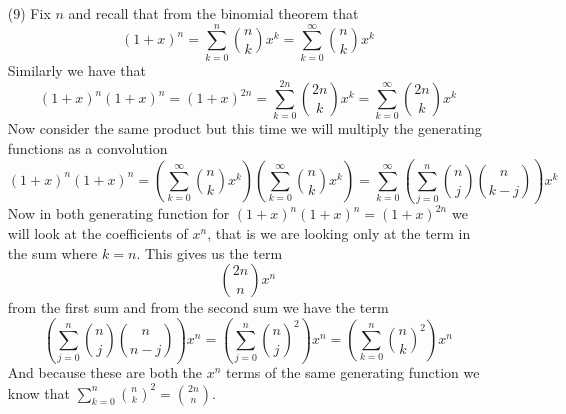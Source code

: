 \documentclass[12pt]{amsart}
\theoremstyle{definition}
\begin{document}
\begin{itemize}
\item[(9)] %
Fix $n$ and recall that from the binomial theorem that
$$(1+x)^n={\sum_{k=0}^n{n\choose k}x^k}={\sum_{k=0}^\infty{n\choose k}x^k}$$
Similarly we have that $$(1+x)^n(1+x)^n={(1+x)^{2n}}={\sum_{k=0}^{2n}{2n\choose k}x^k}={\sum_{k=0}^\infty{2n\choose k}x^k}$$
Now consider the same product but this time we will multiply the generating functions as a convolution
$$(1+x)^n(1+x)^n={\left(\sum_{k=0}^\infty{n\choose k}x^k\right)\left(\sum_{k=0}^\infty{n\choose k}x^k\right)}={\sum_{k=0}^\infty\left(\sum_{j=0}^n{n\choose j}{n\choose k-j}\right)x^k}$$
Now in both generating function for $(1+x)^n(1+x)^n=(1+x)^{2n}$ we will look at the coefficients of $x^n$, that is we are looking only at the term in the sum where $k=n$. This gives us the term 
$${{2n\choose n}x^n}$$
from the first sum and from the second sum we have the term $${\left(\sum_{j=0}^n{n\choose j}{n\choose n-j}\right)x^n}={\left(\sum_{j=0}^n{n\choose j}^2\right)x^n}={\left(\sum_{k=0}^n{n\choose k}^2\right)x^n}$$ And because these are both the $x^n$ terms of the same generating function we know that $\displaystyle{\sum_{k=0}^n{n\choose k}^2}=\displaystyle{{2n\choose n}}$.\\


\end{itemize}
\end{document}
